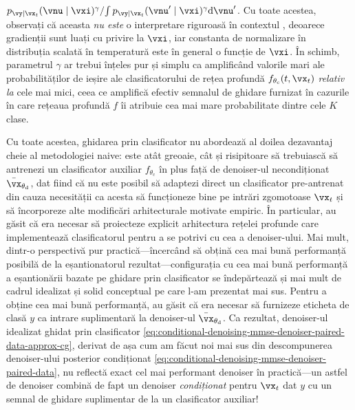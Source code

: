 \documentclass[../../book-main_ro.tex]{subfiles}
\begin{document}
$ { p_{\vy \mid \vx_t}(\vnu\mid \vxi)^\gamma } / { \int p_{\vy \mid \vx_t}(\vnu'\mid
\vxi)^\gamma \odif \vnu' } $.
Cu toate acestea, observați că aceasta \textit{nu este} o interpretare riguroasă în contextul
, deoarece
gradienții sunt luați cu privire la $\vxi$, iar constanta de normalizare în
distribuția scalată în temperatură este în general o funcție de $\vxi$.
În schimb, parametrul $\gamma$ ar trebui înțeles pur și simplu ca amplificând valorile
mari ale probabilităților de ieșire ale clasificatorului de rețea profundă
$f_{\theta_{\mathrm{c}}}(t, \vx_t)$ \textit{relativ la} cele mai mici,
ceea ce amplifică efectiv semnalul de ghidare furnizat în cazurile în care rețeaua profundă
$f$ îi atribuie cea mai mare probabilitate dintre cele $K$ clase.


Cu toate acestea, ghidarea prin clasificator nu abordează al doilea dezavantaj cheie al
metodologiei naive: este atât greoaie, cât și risipitoare să trebuiască să
antrenezi un clasificator auxiliar $f_{\theta_{\mathrm{c}}}$ în plus față de denoiser-ul
necondiționat $\bar{\vx}_{\theta_{\mathrm{d}}}$, dat fiind
că nu este posibil să adaptezi direct un clasificator pre-antrenat
din cauza necesității ca acesta să funcționeze bine pe intrări zgomotoase $\vx_t$ și să încorporeze
alte modificări arhitecturale motivate empiric.
În particular, \citet{Dhariwal2021-hg} au găsit că era necesar să proiecteze explicit
arhitectura rețelei profunde care implementează clasificatorul pentru a se potrivi
cu cea a denoiser-ului.
Mai mult, dintr-o perspectivă pur practică---încercând să obțină cea mai bună
performanță posibilă de la eșantionatorul rezultat---configurația cu cea mai bună performanță
a eșantionării bazate pe ghidare prin clasificator se îndepărtează și mai mult de
cadrul idealizat și solid conceptual pe care l-am prezentat mai sus.
Pentru a obține cea mai bună performanță, \citet{Dhariwal2021-hg} au găsit că era
necesar să furnizeze eticheta de clasă $y$ ca intrare suplimentară la denoiser-ul
$\bar{\vx}_{\theta_{\mathrm{d}}}$. Ca rezultat, denoiser-ul idealizat ghidat prin clasificator
\eqref{eq:conditional-denoising-mmse-denoiser-paired-data-approx-cg},
derivat de \citet{Dhariwal2021-hg} așa cum am făcut noi mai sus din descompunerea
denoiser-ului posterior condiționat
\eqref{eq:conditional-denoising-mmse-denoiser-paired-data}, nu reflectă exact
cel mai performant denoiser în practică---un astfel de denoiser
combină de fapt un denoiser \textit{condiționat} pentru $\vx_t$ dat $y$ cu un
semnal de ghidare suplimentar de la un clasificator auxiliar!
\end{document}
